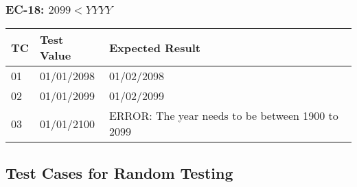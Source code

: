 \documentclass[11pt, oneside]{article}   	%
\begin{document}
\subsubsection{EC-18: $2099 < YYYY$}
\begin{table}[H]
\begin{tabular}{|l|l|l|}
\hline
TC & Test Value & Expected Result                                  \\ \hline
01 & 01/01/2098 & 01/02/2098                                       \\ \hline
02 & 01/01/2099 & 01/02/2099                                       \\ \hline
03 & 01/01/2100 & ERROR: The year needs to be between 1900 to 2099 \\ \hline
\end{tabular}
\end{table}

\subsection{Test Cases for Random Testing}
\end{document}
